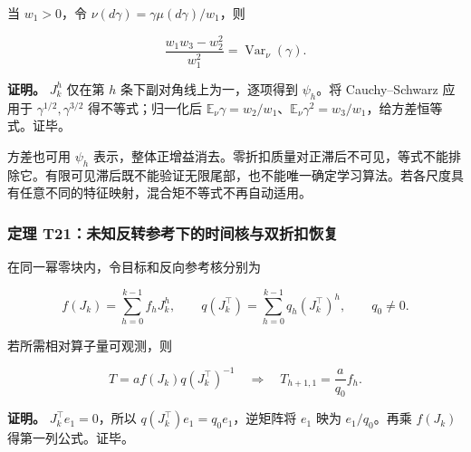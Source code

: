 \documentclass[11pt,a4paper]{article}
\begin{document}
\par
\noindent\begin{minipage}{\linewidth}

当 \(w_1>0\)，令 \(\nu(d\gamma)=\gamma\mu(d\gamma)/w_1\)，则

\[
\frac{w_1w_3-w_2^2}{w_1^2}
=\operatorname{Var}_{\nu}(\gamma).
\]

\end{minipage}\par

\textbf{证明。} \(J_k^h\) 仅在第 \(h\) 条下副对角线上为一，逐项得到
\(\psi_h\)。将 Cauchy–Schwarz 应用于 \(\gamma^{1/2},\gamma^{3/2}\)
得不等式；归一化后
\(\mathbb E_\nu\gamma=w_2/w_1\)、\(\mathbb E_\nu\gamma^2=w_3/w_1\)，给方差恒等式。证毕。

方差也可用 \(\psi_h\)
表示，整体正增益消去。零折扣质量对正滞后不可见，等式不能排除它。有限可见滞后既不能验证无限尾部，也不能唯一确定学习算法。若各尺度具有任意不同的特征映射，混合矩不等式不再自动适用。

\subsubsection{定理
T21：未知反转参考下的时间核与双折扣恢复}\label{ux5b9aux7406-t21ux672aux77e5ux53cdux8f6cux53c2ux8003ux4e0bux7684ux65f6ux95f4ux6838ux4e0eux53ccux6298ux6263ux6062ux590d}

\par
\noindent\begin{minipage}{\linewidth}

在同一幂零块内，令目标和反向参考核分别为

\[
f(J_k)=\sum_{h=0}^{k-1}f_hJ_k^h,\qquad
q(J_k^\top)=\sum_{h=0}^{k-1}q_h(J_k^\top)^h,
\qquad q_0\ne0.
\]

\end{minipage}\par

\par
\noindent\begin{minipage}{\linewidth}

若所需相对算子量可观测，则

\[
T=a f(J_k)q(J_k^\top)^{-1}
\quad\Longrightarrow\quad
T_{h+1,1}=\frac{a}{q_0}f_h.
\]

\end{minipage}\par

\textbf{证明。} \(J_k^\top e_1=0\)，所以
\(q(J_k^\top)e_1=q_0e_1\)，逆矩阵将 \(e_1\) 映为 \(e_1/q_0\)。再乘
\(f(J_k)\) 得第一列公式。证毕。
\end{document}
